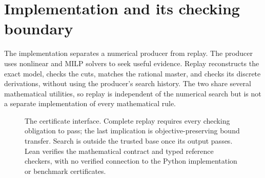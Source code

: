 \section{Implementation and its checking boundary}
\label{sec:implementation}
The implementation separates a numerical producer from replay. The producer uses nonlinear and MILP solvers to seek useful evidence. Replay reconstructs the exact model, checks the cuts, matches the rational master, and checks its discrete derivations, without using the producer's search history. The two share several mathematical utilities, so replay is independent of the numerical search but is not a separate implementation of every mathematical rule.

\begin{figure}[tb]
\centering
{}
\caption{The certificate interface. Complete replay requires every checking obligation to pass; the last implication is objective-preserving bound transfer. Search is outside the trusted base once its output passes. Lean verifies the mathematical contract and typed reference checkers, with no verified connection to the Python implementation or benchmark certificates.}
\label{fig:architecture}
\end{figure}

